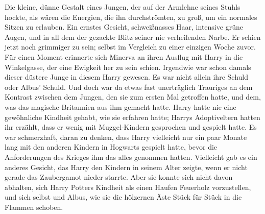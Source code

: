 Die kleine, dünne Gestalt eines Jungen, der auf der Armlehne seines Stuhls hockte, als wären die Energien, die ihn durchströmten, zu groß, um ein normales Sitzen zu erlauben. Ein ernstes Gesicht, schweißnasses Haar, intensive grüne Augen, und in all dem der gezackte Blitz seiner nie verheilenden Narbe. Er schien jetzt noch grimmiger zu sein; selbst im Vergleich zu einer einzigen Woche zuvor. Für einen Moment erinnerte sich Minerva an ihren Ausflug mit Harry in die Winkelgasse, der eine Ewigkeit her zu sein schien. Irgendwie war schon damals dieser düstere Junge in diesem Harry gewesen. Es war nicht allein ihre Schuld oder Albus’ Schuld. Und doch war da etwas fast unerträglich Trauriges an dem Kontrast zwischen dem Jungen, den sie zum ersten Mal getroffen hatte, und dem, was das magische Britannien aus ihm gemacht hatte. Harry hatte nie eine gewöhnliche Kindheit gehabt, wie sie erfahren hatte; Harrys Adoptiveltern hatten ihr erzählt, dass er wenig mit Muggel-Kindern gesprochen und gespielt hatte. Es war schmerzhaft, daran zu denken, dass Harry vielleicht nur ein paar Monate lang mit den anderen Kindern in Hogwarts gespielt hatte, bevor die Anforderungen des Krieges ihm das alles genommen hatten. Vielleicht gab es ein anderes Gesicht, das Harry den Kindern in seinem Alter zeigte, wenn er nicht gerade das Zaubergamot nieder starrte. Aber sie konnte sich nicht davon abhalten, sich Harry Potters Kindheit als einen Haufen Feuerholz vorzustellen, und sich selbst und Albus, wie sie die hölzernen Äste Stück für Stück in die Flammen schoben.

